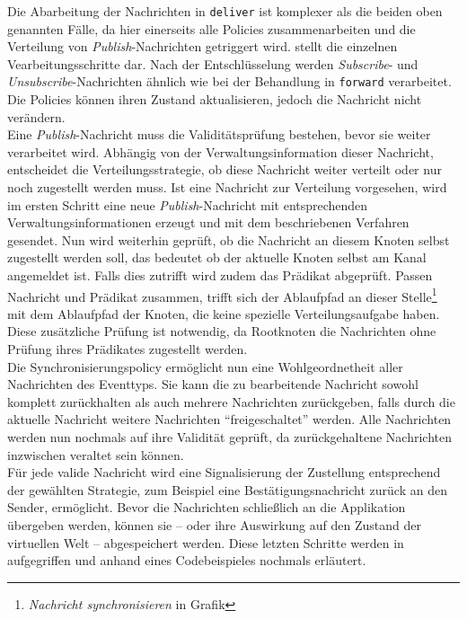 Die Abarbeitung der Nachrichten in \texttt{deliver} ist komplexer als die beiden oben genannten Fälle, da hier einerseits alle Policies zusammenarbeiten und die Verteilung von \emph{Publish}-Nachrichten getriggert wird.  stellt die einzelnen Vearbeitungsschritte dar. Nach der Entschlüsselung werden \emph{Subscribe}- und \emph{Unsubscribe}-Nachrichten ähnlich wie bei der Behandlung in \texttt{forward} verarbeitet. Die Policies können ihren Zustand aktualisieren, jedoch die Nachricht nicht verändern.\\
Eine \emph{Publish}-Nachricht muss die Validitätsprüfung bestehen, bevor sie weiter verarbeitet wird. Abhängig von der Verwaltungsinformation dieser Nachricht, entscheidet die Verteilungsstrategie, ob diese Nachricht weiter verteilt oder nur noch zugestellt werden muss. Ist eine Nachricht zur Verteilung vorgesehen, wird im ersten Schritt eine neue \emph{Publish}-Nachricht mit entsprechenden Verwaltungsinformationen erzeugt und mit dem beschriebenen Verfahren gesendet. Nun wird weiterhin geprüft, ob die Nachricht an diesem Knoten selbst zugestellt werden soll, das bedeutet ob der aktuelle Knoten selbst am Kanal angemeldet ist. Falls dies zutrifft wird zudem das Prädikat abgeprüft. Passen Nachricht und Prädikat zusammen, trifft sich der Ablaufpfad an dieser Stelle\footnote{\emph{Nachricht synchronisieren} in Grafik } mit dem Ablaufpfad der Knoten, die keine spezielle Verteilungsaufgabe haben. Diese zusätzliche Prüfung ist notwendig, da Rootknoten die Nachrichten ohne Prüfung ihres Prädikates zugestellt werden.\\
Die Synchronisierungspolicy ermöglicht nun eine Wohlgeordnetheit aller Nachrichten des Eventtyps. Sie kann die zu bearbeitende Nachricht sowohl komplett zurückhalten als auch mehrere Nachrichten zurückgeben, falls durch die aktuelle Nachricht weitere Nachrichten \enquote{freigeschaltet} werden. Alle Nachrichten werden nun nochmals auf ihre Validität geprüft, da zurückgehaltene Nachrichten inzwischen veraltet sein können.\\
Für jede valide Nachricht wird eine Signalisierung der Zustellung entsprechend der gewählten Strategie, zum Beispiel eine Bestätigungsnachricht zurück an den Sender, ermöglicht. Bevor die Nachrichten schließlich an die Applikation übergeben werden, können sie -- oder ihre Auswirkung auf den Zustand der virtuellen Welt -- abgespeichert werden. Diese letzten Schritte werden in  aufgegriffen und anhand eines Codebeispieles nochmals erläutert.



